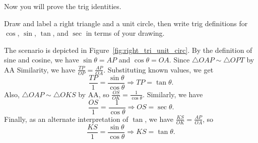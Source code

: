 \documentclass[../gatm_answers.tex]{subfiles}
\begin{document}
\begin{outer_problem}
\item Now you will prove the trig identities.
\end{outer_problem}

\begin{inner_problem}
\item Draw and label a right triangle and a unit circle, then write trig definitions for $\cos$, $\sin$, $\tan$, and $\sec$ in terms of your drawing.
\end{inner_problem}

\noindent The scenario is depicted in Figure~\ref{fig:right_tri_unit_circ}. By the definition of sine and cosine, we have $\sin\theta=AP$ and $\cos\theta=OA$. Since $\triangle OAP \sim \triangle OPT$ by AA Similarity, we have $\frac{TP}{OP}=\frac{AP}{OA}$. Substituting known values, we get $$\frac{TP}{1}=\frac{\sin\theta}{\cos\theta}\Longrightarrow TP=\tan\theta.$$ Also, $\triangle OAP \sim \triangle OKS$ by AA, so $\frac{OS}{OK}=\frac{1}{\cos\theta}$. Similarly, we have $$\frac{OS}{1}=\frac{1}{\cos\theta}\Longrightarrow OS=\sec\theta.$$ Finally, as an alternate interpretation of $\tan$, we have $\frac{KS}{OK}=\frac{AP}{OA}$, so $$\frac{KS}{1}=\frac{\sin\theta}{\cos\theta}\Longrightarrow KS = \tan\theta.$$
\end{document}
